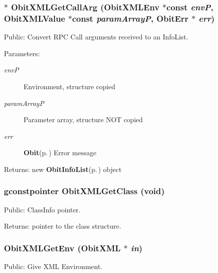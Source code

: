 \subsubsection{$\ast$ Obit\-XMLGet\-Call\-Arg ({\bf Obit\-XMLEnv} $\ast$const  {\em env\-P}, {\bf Obit\-XMLValue} $\ast$const  {\em param\-Array\-P}, {\bf Obit\-Err} $\ast$ {\em err})}\label{ObitXML_8c_a11}


Public: Convert RPC Call arguments received to an Info\-List. 

\begin{Desc}
\item[Parameters:]
\begin{description}
\item[{\em env\-P}]Environment, structure copied \item[{\em param\-Array\-P}]Parameter array, structure NOT copied \item[{\em err}]{\bf Obit}{\rm (p.\,\pageref{structObit})} Error message \end{description}
\end{Desc}
\begin{Desc}
\item[Returns:]new {\bf Obit\-Info\-List}{\rm (p.\,\pageref{structObitInfoList})} object \end{Desc}
\subsubsection{\setlength{\rightskip}{0pt plus 5cm}gconstpointer Obit\-XMLGet\-Class (void)}\label{ObitXML_8c_a9}


Public: Class\-Info pointer. 

\begin{Desc}
\item[Returns:]pointer to the class structure. \end{Desc}
\subsubsection{ Obit\-XMLGet\-Env ({\bf Obit\-XML} $\ast$ {\em in})}\label{ObitXML_8c_a12}


Public: Give XML Environment. 

